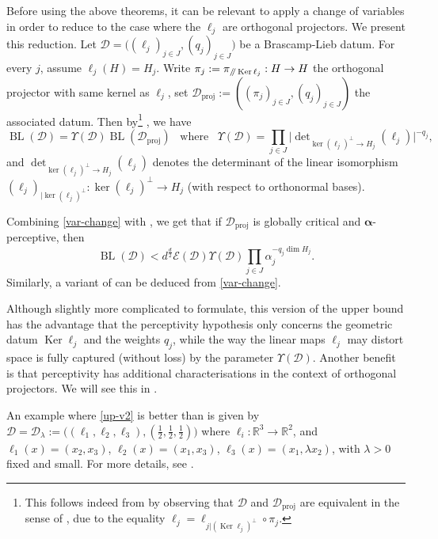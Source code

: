\documentclass[a4paper,english]{amsart}
\theoremstyle{definition}
\newcommand{\R}{\mathbb{R}}
\newcommand{\bba}{\boldsymbol{\alpha}}
\newcommand{\1}{\mathbbm{1}}
\newcommand{\sD} {{\mathscr D}}
\newcommand{\sE}{\mathscr{E}}
\renewcommand{\parallel}{\mathbin{/\mkern-5mu/}}
\newcommand{\abs}[1]{\lvert#1\rvert}    %
\DeclareMathOperator{\Ker}{Ker}
\DeclareMathOperator{\BL}{BL}
\begin{document}
Before using the above theorems, it can be relevant to apply a change of variables in order to reduce to the case where the $\ell_{j}$ are orthogonal projectors. We present this reduction. Let $\sD = \bigl((\ell_j)_{j \in J}, (q_j)_{j \in J}\bigr)$ be a Brascamp-Lieb datum.  For every $j$, assume $\ell_{j}(H)=H_{j}$. Write $\pi_{j}:=\pi_{\parallel \Ker \ell_{j}} :H \rightarrow H$ the orthogonal projector with same kernel as $\ell_{j}$, set $\sD_{\mathrm{proj}}:=((\pi_{j})_{j\in J}, (q_{j})_{j\in J})$ the associated datum. Then by\footnote{This follows indeed from \cite[Lemma 3.3]{BCCT08} by observing that $\sD$ and $\sD_{\mathrm{proj}}$ are equivalent in the sense of \cite[Definition 3.1]{BCCT08}, due to the equality $\ell_{j}=\ell_{j | (\Ker \ell_{j})^\perp}\circ  \pi_{j}$.} \cite[Lemma 3.3]{BCCT08}, we have
\begin{equation}\label{var-change}
\BL(\sD)= \Upsilon(\sD)\BL(\sD_{\mathrm{proj}}) \,\,\,\text{ where }\,\,\,
\Upsilon(\sD) = \prod_{j \in J} \abs{\det\nolimits_{\ker(\ell_j)^\perp \to H_j}(\ell_j)}^{- q_j},
\end{equation}
and $\det\nolimits_{\ker(\ell_j)^\perp \to H_j}(\ell_j)$ denotes the determinant of the linear isomorphism $(\ell_{j})_{|\ker(\ell_j)^\perp} : \ker(\ell_j)^\perp \to H_j$ (with respect to orthonormal bases).

Combining    \eqref{var-change} with , we get that if $\sD_{\mathrm{proj}}$ is globally critical and $\bba$-perceptive, then
\begin{equation}\label{up-v2}
\BL(\sD) < d^{\frac{d}{2}} \sE(\sD) \Upsilon(\sD) \prod_{j \in J} \alpha_j^{- q_j \dim H_j}.
\end{equation}
Similarly, a variant of  can be deduced from \eqref{var-change}.

Although slightly more complicated to formulate, this version of the upper bound has the advantage that the perceptivity hypothesis only concerns the geometric datum $\Ker \ell_{j}$ and the weights $q_{j}$, while the way the linear maps $\ell_{j}$ may distort space is fully captured (without loss) by the parameter $\Upsilon(\sD)$.  Another benefit is that perceptivity has additional characterisations in the context of orthogonal projectors. We will see this in .

An example where \eqref{up-v2} is better than  is given by $\sD=\sD_{\lambda} := \bigl((\ell_1, \ell_2, \ell_{3}), (\frac{1}{2},\frac{1}{2}, \frac{1}{2})\bigr)$ where $\ell_{i}:\R^3\rightarrow \R^2$, and $\ell_{1}(x)=(x_{2}, x_{3})$, $\ell_{2}(x)=(x_{1}, x_{3})$, $\ell_{3}(x)=(x_{1}, \lambda x_{2})$, with  $\lambda>0$ fixed and small.  For more details, see .
\end{document}
